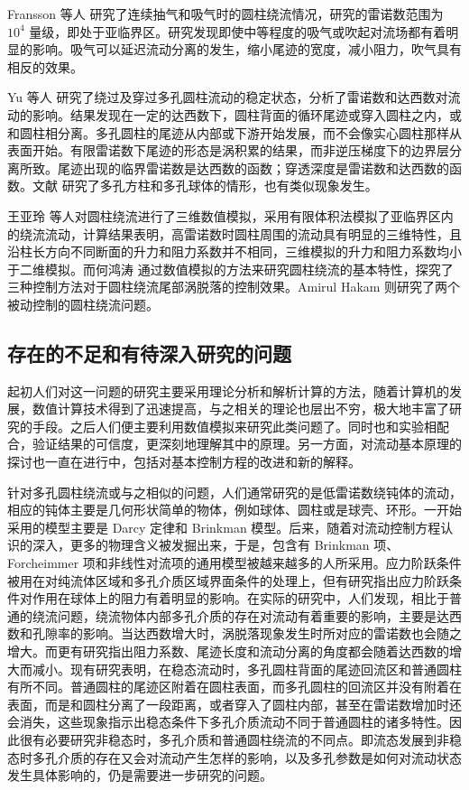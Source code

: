 Fransson 等人 \cite{fransson2004flow} 研究了连续抽气和吸气时的圆柱绕流情况，研究的雷诺数范围为 $10^4$ 量级，即处于亚临界区。研究发现即使中等程度的吸气或吹起对流场都有着明显的影响。吸气可以延迟流动分离的发生，缩小尾迹的宽度，减小阻力，吹气具有相反的效果。

Yu 等人 \cite{Yu2011} 研究了绕过及穿过多孔圆柱流动的稳定状态，分析了雷诺数和达西数对流动的影响。结果发现在一定的达西数下，圆柱背面的循环尾迹或穿入圆柱之内，或和圆柱相分离。多孔圆柱的尾迹从内部或下游开始发展，而不会像实心圆柱那样从表面开始。有限雷诺数下尾迹的形态是涡积累的结果，而非逆压梯度下的边界层分离所致。尾迹出现的临界雷诺数是达西数的函数；穿透深度是雷诺数和达西数的函数。文献  研究了多孔方柱和多孔球体的情形，也有类似现象发生。

王亚玲 \cite{王亚玲2001圆柱绕流的三维数值模拟} 等人对圆柱绕流进行了三维数值模拟，采用有限体积法模拟了亚临界区内的绕流流动，计算结果表明，高雷诺数时圆柱周围的流动具有明显的三维特性，且沿柱长方向不同断面的升力和阻力系数并不相同，三维模拟的升力和阻力系数均小于二维模拟。而何鸿涛 \cite{何鸿涛2009圆柱绕流及其控制的数值模拟研究} 通过数值模拟的方法来研究圆柱绕流的基本特性，探究了三种控制方法对于圆柱绕流尾部涡脱落的控制效果。Amirul Hakam\cite{Hakam2018} 则研究了两个被动控制的圆柱绕流问题。

\subsection{存在的不足和有待深入研究的问题}

起初人们对这一问题的研究主要采用理论分析和解析计算的方法，随着计算机的发展，数值计算技术得到了迅速提高，与之相关的理论也层出不穷，极大地丰富了研究的手段。之后人们便主要利用数值模拟来研究此类问题了。同时也和实验相配合，验证结果的可信度，更深刻地理解其中的原理。另一方面，对流动基本原理的探讨也一直在进行中，包括对基本控制方程的改进和新的解释。

针对多孔圆柱绕流或与之相似的问题，人们通常研究的是低雷诺数绕钝体的流动，相应的钝体主要是几何形状简单的物体，例如球体、圆柱或是球壳、环形。一开始采用的模型主要是 Darcy 定律和 Brinkman 模型。后来，随着对流动控制方程认识的深入，更多的物理含义被发掘出来，于是，包含有 Brinkman 项、Forcheimmer 项和非线性对流项的通用模型被越来越多的人所采用。应力阶跃条件被用在对纯流体区域和多孔介质区域界面条件的处理上，但有研究指出应力阶跃条件对作用在球体上的阻力有着明显的影响。在实际的研究中，人们发现，相比于普通的绕流问题，绕流物体内部多孔介质的存在对流动有着重要的影响，主要是达西数和孔隙率的影响。当达西数增大时，涡脱落现象发生时所对应的雷诺数也会随之增大。而更有研究指出阻力系数、尾迹长度和流动分离的角度都会随着达西数的增大而减小。现有研究表明，在稳态流动时，多孔圆柱背面的尾迹回流区和普通圆柱有所不同。普通圆柱的尾迹区附着在圆柱表面，而多孔圆柱的回流区并没有附着在表面，而是和圆柱分离了一段距离，或者穿入了圆柱内部，甚至在雷诺数增加时还会消失，这些现象指示出稳态条件下多孔介质流动不同于普通圆柱的诸多特性。因此很有必要研究非稳态时，多孔介质和普通圆柱绕流的不同点。即流态发展到非稳态时多孔介质的存在又会对流动产生怎样的影响，以及多孔参数是如何对流动状态发生具体影响的，仍是需要进一步研究的问题。

